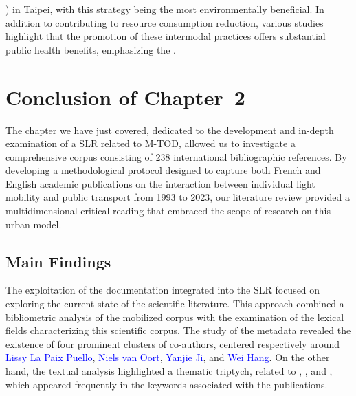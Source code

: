 \begin{refsegment}
{}) in Taipei, with this strategy being the most environmentally beneficial. In addition to contributing to resource consumption reduction, various studies highlight that the promotion of these intermodal practices offers substantial public health benefits, emphasizing the  \textcolor{blue}{\autocites[4270]{bopp_examining_2015}[2738]{papon_evaluation_2017}[8]{adnan_last-mile_2019}}.%

\newpage
{} %
\section*{Conclusion of Chapter~2
    \label{chap2:conclusion}
    }
    
The chapter we have just covered, dedicated to the development and in-depth examination of a \acrshort{SLR} related to \acrshort{M-TOD}, allowed us to investigate a comprehensive corpus consisting of 238 international bibliographic references. By developing a methodological protocol designed to capture both French and English academic publications on the interaction between individual light mobility and public transport from 1993 to 2023, our literature review provided a multidimensional critical reading that embraced the scope of research on this urban model.%

\subsection*{Main Findings
    \label{chap2:principaux-enseignements}
    }
    
The exploitation of the documentation integrated into the \acrshort{SLR} focused on exploring the current state of the scientific literature. This approach combined a bibliometric analysis of the mobilized corpus with the examination of the lexical fields characterizing this scientific corpus. The study of the metadata revealed the existence of four prominent clusters of co-authors, centered respectively around \textcolor{blue}{Lissy La Paix Puello}, \textcolor{blue}{Niels van Oort}, \textcolor{blue}{Yanjie Ji}, and \textcolor{blue}{Wei Hang}. On the other hand, the textual analysis highlighted a thematic triptych, related to , , and , which appeared frequently in the keywords associated with the publications.%


\end{refsegment}
